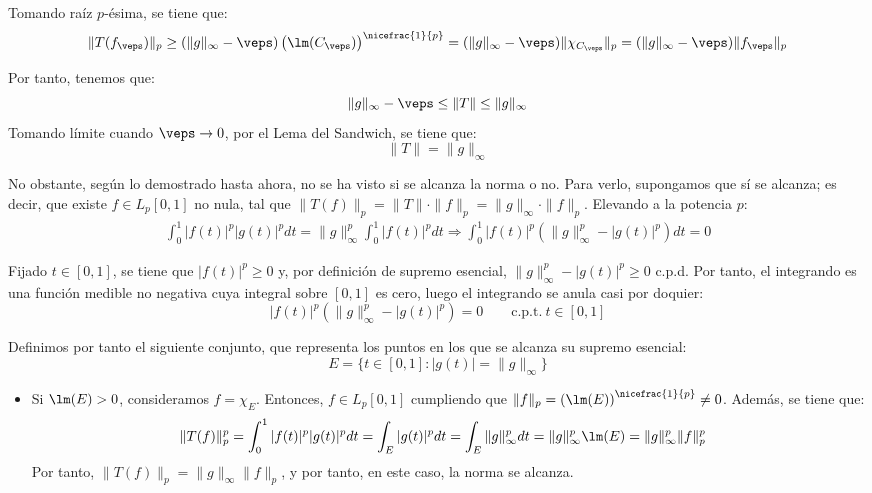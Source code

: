 \begin{ejercicio}
\begin{itemize}
    Tomando raíz $p$-ésima, se tiene que:
    \begin{equation*}
        \|T(f_\veps)\|_p \geq (\|g\|_\infty - \veps) \left(\lm(C_\veps)\right)^{\nicefrac{1}{p}}
        = (\|g\|_\infty - \veps) \|\chi_{C_\veps}\|_p = (\|g\|_\infty - \veps) \|f_\veps\|_p
    \end{equation*}

    Por tanto, tenemos que:
    \begin{equation*}
        \|g\|_\infty - \veps \leq \|T\| \leq \|g\|_\infty
    \end{equation*}
    Tomando límite cuando $\veps \to 0$, por el Lema del Sandwich, se tiene que:
    \begin{equation*}
        \|T\| = \|g\|_\infty
    \end{equation*}

    No obstante, según lo demostrado hasta ahora, no se ha visto si se alcanza la norma o no. Para verlo, supongamos que sí se alcanza; es decir, que existe $f\in L_p[0,1]$ no nula, tal que $\|T(f)\|_p = \|T\| \cdot \|f\|_p= \|g\|_\infty \cdot \|f\|_p$. Elevando a la potencia $p$:
    \begin{align*}
        \int_{0}^1 |f(t)|^p |g(t)|^p dt = \|g\|_\infty^p \int_{0}^1 |f(t)|^p dt
        \Longrightarrow
        \int_{0}^1 |f(t)|^p \left(\|g\|_\infty^p - |g(t)|^p\right) dt = 0
    \end{align*}

    Fijado $t \in [0, 1]$, se tiene que $|f(t)|^p\geq 0$ y, por definición de supremo esencial, $\|g\|_\infty^p - |g(t)|^p \geq 0$ c.p.d. Por tanto, el integrando es una función medible no negativa cuya integral sobre $[0,1]$ es cero, luego el integrando se anula casi por doquier:
    \begin{equation*}
        |f(t)|^p \left(\|g\|_\infty^p - |g(t)|^p\right) = 0 \qquad \text{c.p.t.}\ t\in [0, 1]
    \end{equation*}

    Definimos por tanto el siguiente conjunto, que representa los puntos en los que se alcanza su supremo esencial:
    \begin{equation*}
        E = \{t \in [0, 1] : |g(t)| = \|g\|_\infty\}
    \end{equation*}

    \begin{itemize}
        \item Si $\lm(E)>0$, consideramos $f=\chi_E$. Entonces, $f \in L_p[0,1]$ cumpliendo que $\|f\|_p = \left(\lm(E)\right)^{\nicefrac{1}{p}}\neq 0$. Además, se tiene que:
        \begin{align*}
            \|T(f)\|_p^p &= \int_{0}^1 |f(t)|^p |g(t)|^p dt = \int_{E} |g(t)|^p dt = \int_{E} \|g\|_\infty^p dt = \|g\|_\infty^p \lm(E) = \|g\|_\infty^p \|f\|_p^p
        \end{align*}
        Por tanto, $\|T(f)\|_p = \|g\|_\infty \|f\|_p$, y por tanto, en este caso, la norma se alcanza.


\end{itemize}
\end{itemize}
\end{ejercicio}
